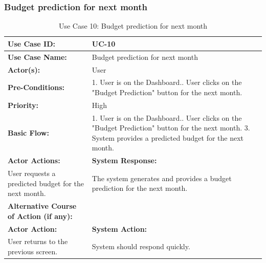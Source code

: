 \documentclass[12pt]{article}
\begin{document}
\subsubsection{Budget prediction for next month}
\vspace{0.5 cm}
    \begin{table}[H] %
    \centering
    \begin{tabular}{|p{4cm}|p{10cm}|}
        \hline
        \textbf{Use Case ID:} & UC-10 \\ \hline
        \textbf{Use Case Name:} & Budget prediction for next month \\ \hline
        \textbf{Actor(s):} & User \\ \hline
        \textbf{Pre-Conditions:} & 
        1. User is on the Dashboard.\newline
2. User clicks on the "Budget Prediction" button for the next month. \\ \hline
        \textbf{Priority:} & High \\ \hline
        \textbf{Basic Flow:} & 1. User is on the Dashboard.\newline
2. User clicks on the "Budget Prediction" button for the next month.
3. System provides a predicted budget for the next month.\\ \hline
        \textbf{Actor Actions:} & \textbf{System Response:} \\ \hline
        User requests a predicted budget for the next month. & The system generates and provides a budget prediction for the next month. \\ \hline
        \textbf{Alternative Course of Action (if any):} &  \\ \hline
        \textbf{Actor Action:} & \textbf{System Action:} \\ \hline
      User returns to the previous screen. & System should respond quickly.\\ \hline
     \end{tabular} 
    \caption{Use Case 10: Budget prediction for next month}
\end{table}



\newpage
\vspace{1 cm} %
\noindent
\end{document}
